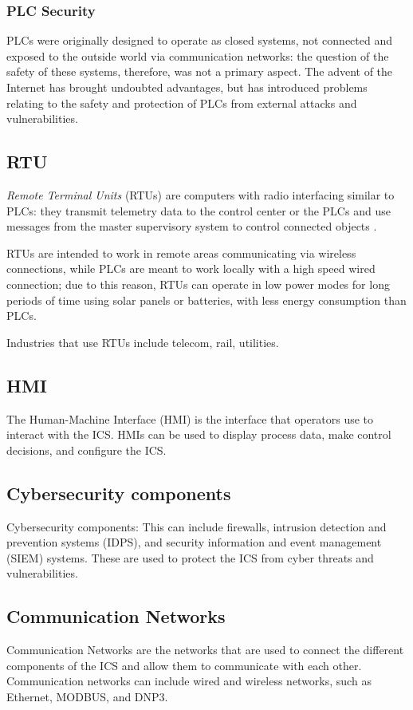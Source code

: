 \subsubsection{PLC Security}
\label{subsubsec:plc_security}
PLCs were originally designed to operate as closed systems, not connected and exposed to the outside world via communication networks: the question of the safety of these systems, therefore, was not a primary aspect. The advent of the Internet has brought undoubted advantages, but has introduced problems relating to the safety and protection of PLCs from external attacks and vulnerabilities.

\subsection{RTU}
\label{subsec:rtu}
\textit{Remote Terminal Units} (RTUs) are computers with radio interfacing similar to PLCs: they transmit telemetry data to the control center or the PLCs
and use messages from the master supervisory system to control connected objects \cite{rtu_definition}.

\bigskip
RTUs are intended to work in remote areas communicating via wireless connections, while PLCs are meant to work locally with a high speed wired connection; due to this reason, RTUs can operate in low power modes for long periods of time using solar panels or batteries, with less energy consumption than PLCs.

\bigskip
Industries that use RTUs include telecom, rail, utilities.

\subsection{HMI}
\label{subsec:hmi}
The Human-Machine Interface (HMI) is the interface that operators use to interact with the ICS. HMIs can be used to display process data, make control decisions, and configure the ICS.

\subsection{Cybersecurity components}
Cybersecurity components: This can include firewalls, intrusion detection and prevention systems (IDPS), and security information and event management (SIEM) systems. These are used to protect the ICS from cyber threats and vulnerabilities.

\subsection{Communication Networks}
Communication Networks are the networks that are used to connect the different components of the ICS and allow them to communicate with each other. Communication networks can include wired and wireless networks, such as Ethernet, MODBUS, and DNP3.

